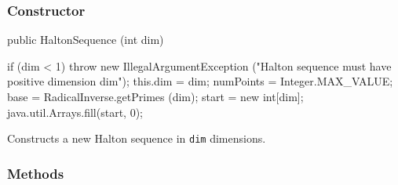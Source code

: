 \subsubsection*{Constructor}

\begin{code}
   public HaltonSequence (int dim) \begin{hide} {
      if (dim < 1)
         throw new IllegalArgumentException
            ("Halton sequence must have positive dimension dim");
      this.dim  = dim;
      numPoints = Integer.MAX_VALUE;
      base = RadicalInverse.getPrimes (dim);
      start = new int[dim];
      java.util.Arrays.fill(start, 0);
   }\end{hide}
\end{code}
 \begin{tabb}
   Constructs a new Halton sequence %
    in \texttt{dim} dimensions.
 \end{tabb}
\begin{htmlonly}
\end{htmlonly}


\subsubsection*{Methods}

